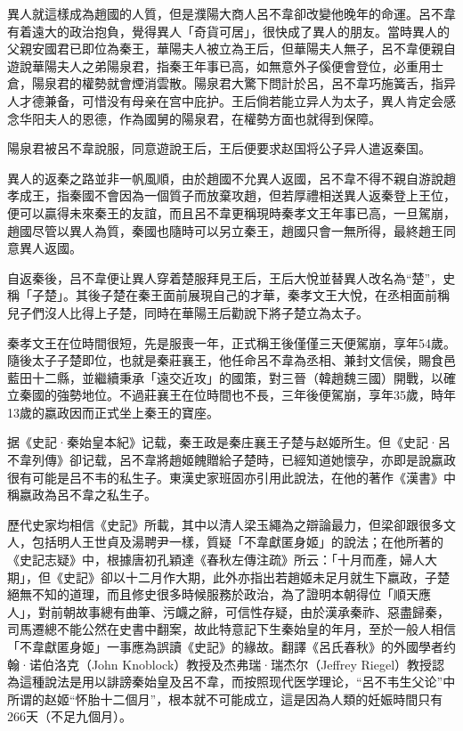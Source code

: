 異人就這樣成為趙國的人質，但是濮陽大商人呂不韋卻改變他晚年的命運。呂不韋有着遠大的政治抱負，覺得異人「奇貨可居」，很快成了異人的朋友。當時異人的父親安國君已即位為秦王，華陽夫人被立為王后，但華陽夫人無子，呂不韋便親自遊說華陽夫人之弟陽泉君，指秦王年事已高，如無意外子傒便會登位，必重用士倉，陽泉君的權勢就會煙消雲散。陽泉君大驚下問計於呂，呂不韋巧施簧舌，指异人才德兼备，可惜没有母亲在宫中庇护。王后倘若能立异人为太子，異人肯定会感念华阳夫人的恩德，作為國舅的陽泉君，在權勢方面也就得到保障。

陽泉君被呂不韋說服，同意遊說王后，王后便要求赵国将公子异人遣返秦国。

異人的返秦之路並非一帆風順，由於趙國不允異人返國，呂不韋不得不親自游說趙孝成王，指秦國不會因為一個質子而放棄攻趙，但若厚禮相送異人返秦登上王位，便可以贏得未來秦王的友誼，而且呂不韋更稱現時秦孝文王年事已高，一旦駕崩，趙國尽管以異人為質，秦國也隨時可以另立秦王，趙國只會一無所得，最終趙王同意異人返國。

自返秦後，吕不韋便让異人穿着楚服拜見王后，王后大悅並替異人改名為“楚”，史稱「子楚」。其後子楚在秦王面前展現自己的才華，秦孝文王大悅，在丞相面前稱兒子們沒人比得上子楚，同時在華陽王后勸說下將子楚立為太子。

秦孝文王在位時間很短，先是服喪一年，正式稱王後僅僅三天便駕崩，享年54歲。隨後太子子楚即位，也就是秦莊襄王，他任命呂不韋為丞相、兼封文信侯，賜食邑藍田十二縣，並繼續秉承「遠交近攻」的國策，對三晉（韓趙魏三國）開戰，以確立秦國的強勢地位。不過莊襄王在位時間也不長，三年後便駕崩，享年35歲，時年13歲的嬴政因而正式坐上秦王的寶座。

据《史記·秦始皇本紀》记载，秦王政是秦庄襄王子楚与赵姬所生。但《史記·呂不韋列傳》卻记载，呂不韋將趙姬餽贈給子楚時，已經知道她懷孕，亦即是說嬴政很有可能是吕不韦的私生子。東漢史家班固亦引用此說法，在他的著作《漢書》中稱嬴政為呂不韋之私生子。

歷代史家均相信《史記》所載，其中以清人梁玉繩為之辯論最力，但梁卻跟很多文人，包括明人王世貞及湯聘尹一樣，質疑「不韋獻匿身姬」的說法；在他所著的《史記志疑》中，根據唐初孔穎達《春秋左傳注疏》所云：「十月而產，婦人大期」，但《史記》卻以十二月作大期，此外亦指出若趙姬未足月就生下嬴政，子楚絕無不知的道理，而且修史很多時候服務於政治，為了證明本朝得位「順天應人」，對前朝故事總有曲筆、污衊之辭，可信性存疑，由於漢承秦祚、惡盡歸秦，司馬遷總不能公然在史書中翻案，故此特意記下生秦始皇的年月，至於一般人相信「不韋獻匿身姬」一事應為誤讀《史記》的緣故。翻譯《呂氏春秋》的外國學者约翰·诺伯洛克（John Knoblock）教授及杰弗瑞·瑞杰尔（Jeffrey Riegel）教授認為這種說法是用以誹謗秦始皇及呂不韋，而按照现代医学理论，“呂不韦生父论”中所谓的赵姬“怀胎十二個月”，根本就不可能成立，這是因為人類的妊娠時間只有266天（不足九個月）。

